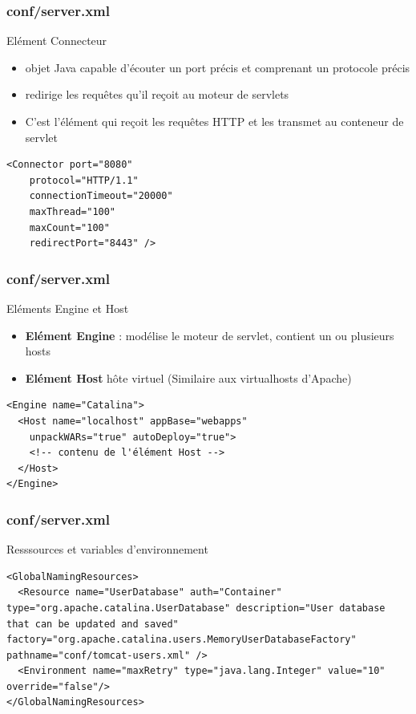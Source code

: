 \begin{frame}
  \frametitle{conf/server.xml}
		Elément Connecteur
		\begin{itemize} 
   		\item objet Java capable d'écouter un port précis et comprenant un protocole précis
    	\item redirige les requêtes qu'il reçoit au moteur de servlets
      \item C'est l'élément qui reçoit les requêtes HTTP et les transmet au conteneur de servlet
		\end{itemize}

		\begin{lstlisting}
<Connector port="8080"
	protocol="HTTP/1.1"
	connectionTimeout="20000"
	maxThread="100"
	maxCount="100"
	redirectPort="8443" />
		\end{lstlisting}
\end{frame}

\begin{frame}
    \frametitle{conf/server.xml}
		Eléments Engine et Host
		\begin{itemize}
   		\item \textbf{Elément Engine} : modélise le moteur de servlet, contient un ou plusieurs hosts
    	\item \textbf{Elément Host} hôte virtuel (Similaire aux virtualhosts d'Apache)
		\end{itemize}

		\begin{lstlisting}
<Engine name="Catalina">
  <Host name="localhost" appBase="webapps"
    unpackWARs="true" autoDeploy="true">
    <!-- contenu de l'élément Host -->
  </Host>
</Engine>
		\end{lstlisting}
\end{frame}

\begin{frame}
  \frametitle{conf/server.xml}
		Resssources et variables d'environnement

		\begin{lstlisting}
<GlobalNamingResources>
  <Resource name="UserDatabase" auth="Container" type="org.apache.catalina.UserDatabase" description="User database that can be updated and saved" factory="org.apache.catalina.users.MemoryUserDatabaseFactory" pathname="conf/tomcat-users.xml" />
  <Environment name="maxRetry" type="java.lang.Integer" value="10" override="false"/>
</GlobalNamingResources>

		\end{lstlisting}
\end{frame}


